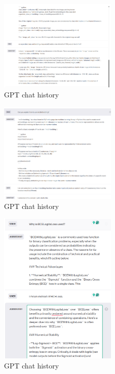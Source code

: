 \documentclass{article}
\begin{document}
\begin{figure}
    \centering
    \includegraphics[width=0.5\textwidth]{report_data/g-8.png}
    \caption{GPT chat history}
\end{figure}


\begin{figure}
    \centering
    \includegraphics[width=0.5\textwidth]{report_data/g-9.png}
    \caption{GPT chat history}
\end{figure}


\begin{figure}
    \centering
    \includegraphics[width=0.5\textwidth]{report_data/g-10.png}
    \caption{GPT chat history}
\end{figure}
\end{document}
